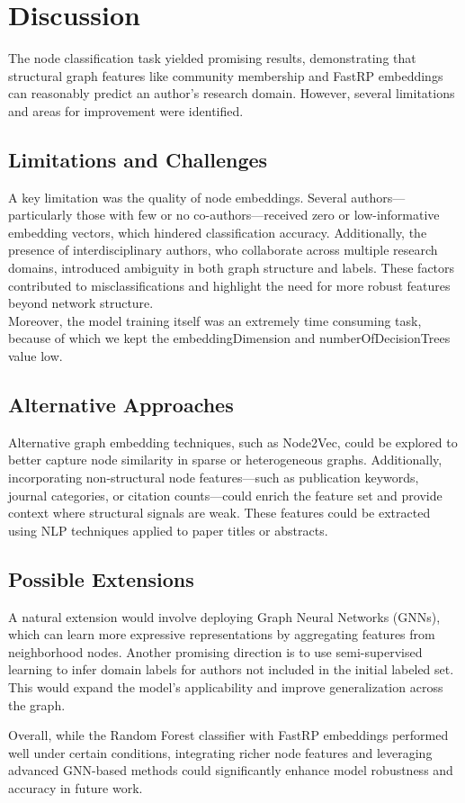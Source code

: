 \documentclass[conference, 12pt]{IEEEtran}
\begin{document}
\section{Discussion}

The node classification task yielded promising results, demonstrating that structural graph features like community membership and FastRP embeddings can reasonably predict an author's research domain. However, several limitations and areas for improvement were identified.

\subsection{Limitations and Challenges}
A key limitation was the quality of node embeddings. Several authors—particularly those with few or no co-authors—received zero or low-informative embedding vectors, which hindered classification accuracy. Additionally, the presence of interdisciplinary authors, who collaborate across multiple research domains, introduced ambiguity in both graph structure and labels. These factors contributed to misclassifications and highlight the need for more robust features beyond network structure.
\\Moreover, the model training itself was an extremely time consuming task, because of which we kept the embeddingDimension and numberOfDecisionTrees value low.

\subsection{Alternative Approaches}
Alternative graph embedding techniques, such as Node2Vec, could be explored to better capture node similarity in sparse or heterogeneous graphs. Additionally, incorporating non-structural node features—such as publication keywords, journal categories, or citation counts—could enrich the feature set and provide context where structural signals are weak. These features could be extracted using NLP techniques applied to paper titles or abstracts.

\subsection{Possible Extensions}
A natural extension would involve deploying Graph Neural Networks (GNNs), which can learn more expressive representations by aggregating features from neighborhood nodes. 
 Another promising direction is to use semi-supervised learning to infer domain labels for authors not included in the initial labeled set. This would expand the model’s applicability and improve generalization across the graph.

Overall, while the Random Forest classifier with FastRP embeddings performed well under certain conditions, integrating richer node features and leveraging advanced GNN-based methods could significantly enhance model robustness and accuracy in future work.



\end{document}
